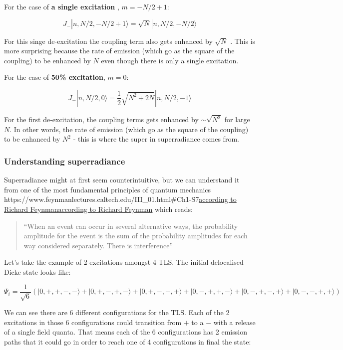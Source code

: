 \documentclass[
]{article}
\let\oldhref\href
\renewcommand{\href}[2]{\ifx#1\urlprefix\oldhref{#1}{#2}\else\uline{\oldhref{#1}{#2}}\fi}
\renewcommand{\[}{\begin{equation}}
\renewcommand{\]}{\end{equation}}
\begin{document}
For the case of \textbf{a single excitation} , \(m=-N/2 + 1\):

\[
J_- |n, N/2, -N/2 +1\rangle  = \sqrt{N}|n, N/2, -N/2\rangle
\]

For this singe de-excitation the coupling term also gets enhanced by
\(\sqrt{N}\) . This is more surprising because the rate of emission
(which go as the square of the coupling) to be enhanced by \(N\) even
though there is only a single excitation.

For the case of \textbf{50\% excitation}, \(m=0\):

\[
J_- |n, N/2, 0 \rangle  = \frac{1}{2}\sqrt{N^2 + 2N}|n, N/2, -1\rangle
\]

For the first de-excitation, the coupling terms gets enhanced by
\(\sim\sqrt{N^2}\) for large \(N\). In other words, the rate of emission
(which go as the square of the coupling) to be enhanced by \(N^2\) -
this is where the super in superradiance comes from.

\subsubsection{Understanding
superradiance}\label{understanding-superradiance}

Superradiance might at first seem counterintuitive, but we can
understand it from one of the most fundamental principles of quantum
mechanics
\href{https://www.feynmanlectures.caltech.edu/III_01.html\#Ch1-S7}{according
to Richard Feynman} which reads:

\begin{quote}
``When an event can occur in several alternative ways, the probability
amplitude for the event is the sum of the probability amplitudes for
each way considered separately. There is interference''
\end{quote}

Let's take the example of 2 excitations amongst 4 TLS. The initial
delocalised Dicke state looks like:

\[
\Psi_i = \frac{1}{\sqrt{6}}\left(| 0, +, +, -, - \rangle + | 0, +, -, +, - \rangle + | 0, +, -, -, + \rangle + | 0, -, +, +, - \rangle + | 0, -, +, -, + \rangle + | 0, -, -, +, + \rangle \right)
\]

We can see there are 6 different configurations for the TLS. Each of the
2 excitations in those 6 configurations could transition from \(+\) to a
\(-\) with a release of a single field quanta. That means each of the 6
configurations has 2 emission paths that it could go in order to reach
one of 4 configurations in final the state:
\end{document}
